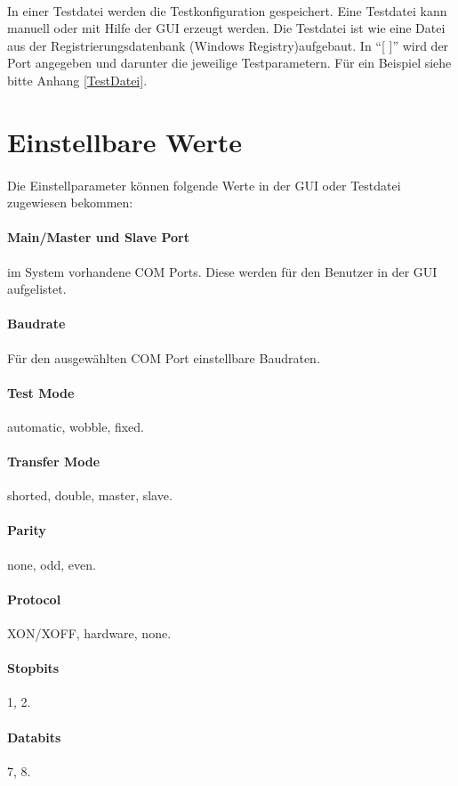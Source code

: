 \paragraph{}
In einer Testdatei werden die Testkonfiguration gespeichert. Eine Testdatei kann manuell oder mit Hilfe der GUI erzeugt werden. Die Testdatei ist wie eine Datei aus der Registrierungsdatenbank (Windows Registry)aufgebaut. In "`[ ]"' wird der Port angegeben und darunter die jeweilige Testparametern. Für ein Beispiel siehe bitte Anhang \ref{TestDatei}.


\section{Einstellbare Werte}
\paragraph{}
Die Einstellparameter können folgende Werte in der GUI oder Testdatei zugewiesen bekommen:
\paragraph{Main/Master und Slave Port} im System vorhandene COM Ports. Diese werden für den Benutzer in der GUI aufgelistet.
\paragraph{Baudrate} Für den ausgewählten COM Port einstellbare Baudraten.
\paragraph{Test Mode} automatic, wobble, fixed.
\paragraph{Transfer Mode} shorted, double, master, slave.
\paragraph{Parity} none, odd, even.
\paragraph{Protocol} XON/XOFF, hardware, none.
\paragraph{Stopbits} 1, 2.
\paragraph{Databits} 7, 8.
